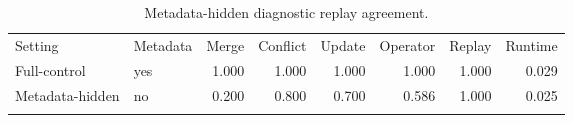 \begin{table}[t]
\caption{Metadata-hidden diagnostic replay agreement.}
\label{tab:metadata-hidden}
\begin{tabular*}{\hsize}{@{\extracolsep{\fill}}llrrrrrr@{}}
\toprule
Setting & Metadata & Merge & Conflict & Update & Operator & Replay & Runtime\\
\colrule
Full-control & yes & 1.000 & 1.000 & 1.000 & 1.000 & 1.000 & 0.029\\
Metadata-hidden & no & 0.200 & 0.800 & 0.700 & 0.586 & 1.000 & 0.025\\
\botrule
\end{tabular*}
\end{table}
